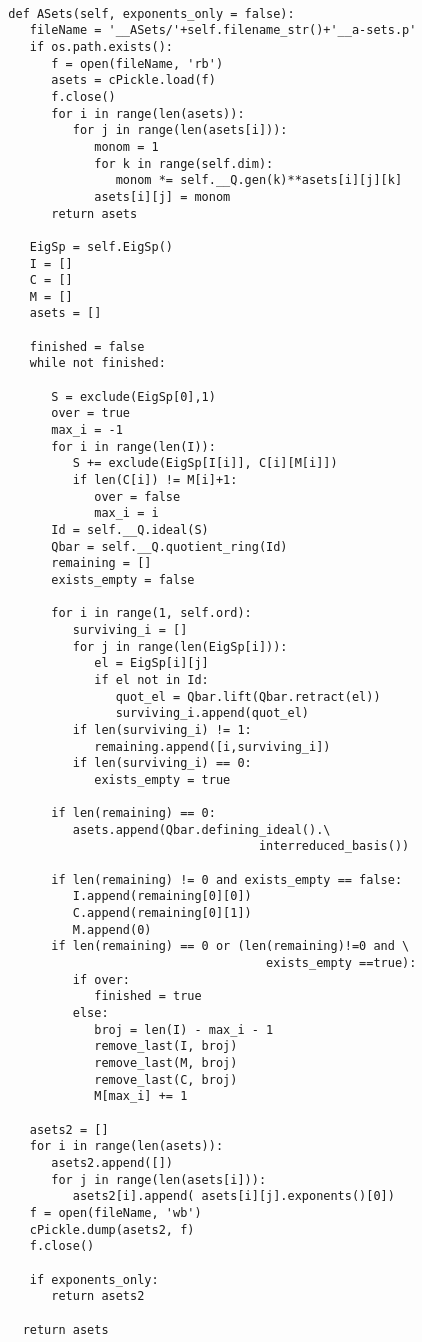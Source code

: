 \singlespacing
\begin{verbatim}

  def ASets(self, exponents_only = false):
     fileName = '__ASets/'+self.filename_str()+'__a-sets.p'
     if os.path.exists():
        f = open(fileName, 'rb')
        asets = cPickle.load(f)
        f.close()         
        for i in range(len(asets)):
           for j in range(len(asets[i])):
              monom = 1
              for k in range(self.dim):
                 monom *= self.__Q.gen(k)**asets[i][j][k]
              asets[i][j] = monom
        return asets

     EigSp = self.EigSp()
     I = []
     C = []
     M = []
     asets = []

     finished = false
     while not finished:

        S = exclude(EigSp[0],1)
        over = true
        max_i = -1
        for i in range(len(I)):
           S += exclude(EigSp[I[i]], C[i][M[i]])
           if len(C[i]) != M[i]+1:
              over = false
              max_i = i
        Id = self.__Q.ideal(S)
        Qbar = self.__Q.quotient_ring(Id)
        remaining = []
        exists_empty = false

        for i in range(1, self.ord):
           surviving_i = []
           for j in range(len(EigSp[i])):
              el = EigSp[i][j]
              if el not in Id:
                 quot_el = Qbar.lift(Qbar.retract(el))
                 surviving_i.append(quot_el)
           if len(surviving_i) != 1:
              remaining.append([i,surviving_i])
           if len(surviving_i) == 0:
              exists_empty = true

        if len(remaining) == 0:
           asets.append(Qbar.defining_ideal().\
                                     interreduced_basis())

        if len(remaining) != 0 and exists_empty == false:
           I.append(remaining[0][0])
           C.append(remaining[0][1])
           M.append(0)
        if len(remaining) == 0 or (len(remaining)!=0 and \
                                      exists_empty ==true):
           if over:
              finished = true
           else:
              broj = len(I) - max_i - 1
              remove_last(I, broj)
              remove_last(M, broj)
              remove_last(C, broj)
              M[max_i] += 1 

     asets2 = []
     for i in range(len(asets)):
        asets2.append([])
        for j in range(len(asets[i])):
           asets2[i].append( asets[i][j].exponents()[0])
     f = open(fileName, 'wb')
     cPickle.dump(asets2, f)
     f.close()      
      
     if exponents_only:
        return asets2
 
    return asets
\end{verbatim}

